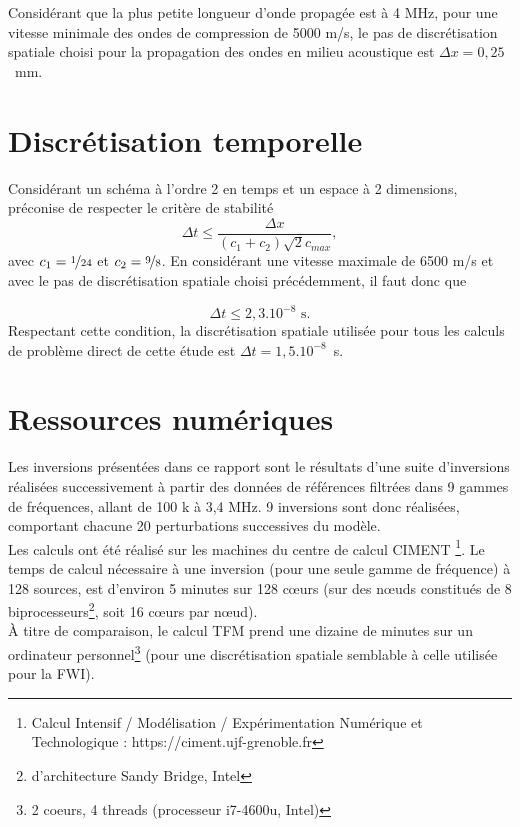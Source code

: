 Considérant que la plus petite longueur d'onde propagée est à 4 MHz, pour une vitesse minimale des ondes de compression de 5000 m/s, le pas de discrétisation spatiale choisi pour la propagation des ondes en milieu acoustique est $\Delta x=0,25$~mm.

\section*{Discrétisation temporelle}

Considérant un schéma à l'ordre 2 en temps et un espace à 2 dimensions, \cite{levander} préconise de respecter le critère de stabilité  
\begin{equation}
	\Delta t \leq \frac{\Delta x}{(c_{1}+c_{2})\sqrt{2} c_{max}},
\end{equation}
avec $c_{1}=\nicefrac{1}{24}$ et $c_{2}=\nicefrac{9}{8}$. En considérant une vitesse maximale de 6500 m/s et avec le pas de discrétisation spatiale choisi précédemment, il faut donc que 

\begin{equation}
	\Delta t \leq 2,3.10^{-8} \text{~s.}
\end{equation}
Respectant cette condition, la discrétisation spatiale utilisée pour tous les calculs de problème direct de cette étude est $\Delta t=1,5.10^{-8}$~s.



\section*{Ressources numériques}

Les inversions présentées dans ce rapport sont le résultats d'une suite d'inversions réalisées successivement à partir des données de références filtrées dans 9 gammes de fréquences, allant de 100 k à 3,4 MHz. 9 inversions sont donc réalisées, comportant chacune 20 perturbations successives du modèle.\\

Les calculs ont été réalisé sur les machines du centre de calcul CIMENT \footnote{Calcul Intensif / Modélisation / Expérimentation Numérique et Technologique : https://ciment.ujf-grenoble.fr}. Le temps de calcul nécessaire à une inversion (pour une seule gamme de fréquence) à 128 sources, est d'environ 5 minutes sur 128 cœurs  (sur des nœuds constitués de 8 biprocesseurs\footnote{d'architecture Sandy Bridge, Intel}, soit 16 cœurs par nœud).\\

 À titre de comparaison,  le calcul TFM prend une dizaine de minutes sur un ordinateur personnel\footnote{2 coeurs, 4 threads (processeur i7-4600u, Intel)} (pour une discrétisation spatiale semblable à celle utilisée pour la FWI).




